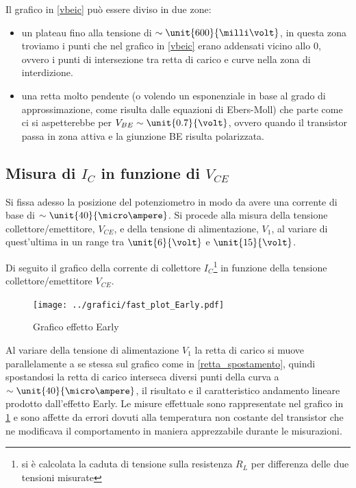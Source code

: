 \documentclass[10pt,a4paper]{article}
\begin{document}
Il grafico in \figurename{\ref{vbeic}} può essere diviso in due zone:
\begin{itemize}
	\item un plateau fino alla tensione di $\sim \unit{600}{\milli\volt}$, in questa zona troviamo i punti che nel grafico in \figurename{\ref{vbeic}} erano addensati vicino allo $0$, ovvero i punti di intersezione tra retta di carico e curve nella zona di interdizione.
	\item una retta molto pendente (o volendo un esponenziale in base al grado di approssimazione, come risulta dalle equazioni di Ebers-Moll) che parte come ci si aspetterebbe per $V_{BE} \sim \unit{0.7}{\volt}$, ovvero quando il transistor passa in zona attiva e la giunzione BE risulta polarizzata.
\end{itemize}

\subsection{Misura di $I_C$ in funzione di $V_{CE}$}
Si fissa adesso la posizione del potenziometro in modo da avere una corrente di base di $\sim \unit{40}{\micro\ampere}$. Si procede alla misura della tensione collettore/emettitore, $V_{CE}$, e della tensione di alimentazione, $V_1$, al variare di quest'ultima in un range tra $\unit{6}{\volt}$ e $\unit{15}{\volt}$.

Di seguito il grafico della corrente di collettore $I_C$\footnote{si è calcolata la caduta di tensione sulla resistenza $R_L$ per differenza delle due tensioni misurate} in funzione della tensione collettore/emettitore $V_{CE}$.

\begin{figure}[h!]
	\centering
	\begin{minipage}[h!]{0.3\textwidth}
		\centering
		\resizebox{\textwidth}{!}{
			}
	\end{minipage}
	\begin{minipage}[d]{0.69\textwidth}
		\centering
		\texttt{[image: ../grafici/fast\_plot\_Early.pdf]}
		\caption{Grafico effetto Early}
		\label{early}
	\end{minipage}
\end{figure}

Al variare della tensione di alimentazione $V_1$ la retta di carico si muove parallelamente a se stessa sul grafico come in \figurename{\ref{retta_spostamento}}, quindi spostandosi la retta di carico interseca diversi punti della curva a  $\sim \unit{40}{\micro\ampere}$, il risultato e il caratteristico andamento lineare prodotto dall'effetto Early. Le misure effettuale sono rappresentate nel grafico in \figurename{\ref{early}} e sono affette da errori dovuti alla temperatura non costante del transistor che ne modificava il comportamento in maniera apprezzabile durante le misurazioni.
\end{document}

